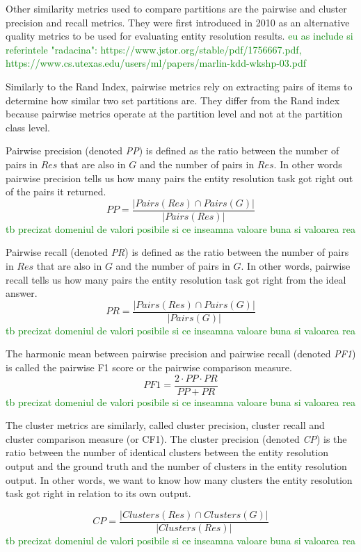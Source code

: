 Other similarity metrics used to compare partitions are the pairwise and
cluster precision and recall metrics.
They were first introduced in 2010 as an alternative quality
metrics to be used for evaluating entity resolution results\cite{Men10}. 
\textcolor{green}{eu as include si referintele "radacina": https://www.jstor.org/stable/pdf/1756667.pdf, https://www.cs.utexas.edu/users/ml/papers/marlin-kdd-wkshp-03.pdf}

Similarly to the Rand Index, pairwise metrics rely on extracting pairs of
items to determine how similar two set partitions are.
They differ from the Rand index because pairwise metrics operate at the
partition level and not at the partition class level.

Pairwise precision (denoted \textit{PP}) is defined as the ratio between the
number of pairs in $Res$ that are also in $G$ and the number of pairs in
$Res$.
In other words pairwise precision tells us how many pairs the entity
resolution task got right out of the pairs it returned.
\[
    PP = \frac{|Pairs(Res) \cap Pairs(G)|}{|Pairs(Res)|}
\]
\textcolor{green}{tb precizat domeniul de valori posibile si ce inseamna valoare buna si valoarea rea}

Pairwise recall (denoted \textit{PR}) is defined as the ratio between the
number of pairs in $Res$ that are also in $G$ and the number of pairs in $G$.
In other words, pairwise recall tells us how many pairs the entity
resolution task got right from the ideal answer.
\[
    PR = \frac{|Pairs(Res) \cap Pairs(G)|}{|Pairs(G)|}
\]
\textcolor{green}{tb precizat domeniul de valori posibile si ce inseamna valoare buna si valoarea rea}

The harmonic mean between pairwise precision and pairwise recall (denoted
\textit{PF1}) is called the pairwise F1 score or the pairwise comparison
measure\cite{Men10}.
\[
    PF1=\frac{2 \cdot PP \cdot PR}{PP + PR}
\]
\textcolor{green}{tb precizat domeniul de valori posibile si ce inseamna valoare buna si valoarea rea}

The cluster metrics are similarly, called cluster precision, cluster recall and
cluster comparison measure (or CF1).
The cluster precision (denoted \textit{CP}) is the ratio between the number
of identical clusters between the entity resolution output and the ground
truth and the number of clusters in the entity resolution output.
In other words, we want to know how many clusters the entity resolution task
got right in relation to its own output.

\[
    CP=\frac{|Clusters(Res) \cap Clusters(G)|}{|Clusters(Res)|}
\]
\textcolor{green}{tb precizat domeniul de valori posibile si ce inseamna valoare buna si valoarea rea}

